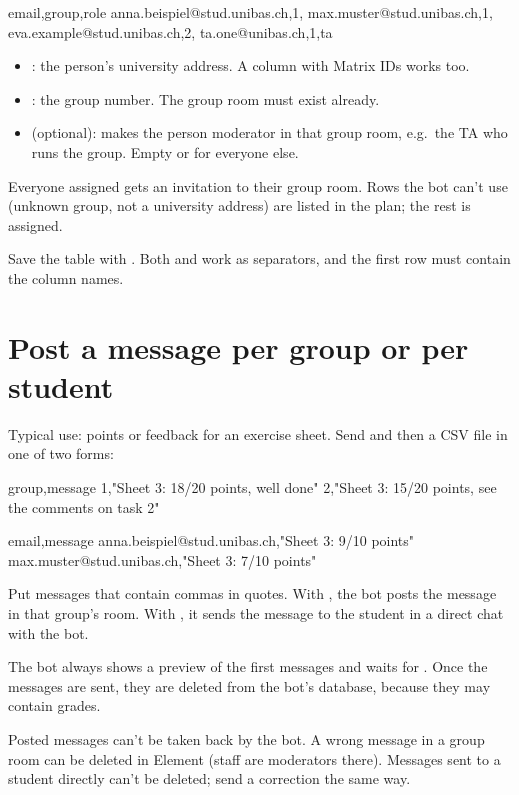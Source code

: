 \begin{codefile}
email,group,role
anna.beispiel@stud.unibas.ch,1,
max.muster@stud.unibas.ch,1,
eva.example@stud.unibas.ch,2,
ta.one@unibas.ch,1,ta
\end{codefile}

\begin{itemize}
  \item {}: the person's university address. A column  with Matrix IDs
        works too.
  \item {}: the group number. The group room must exist already.
  \item {} (optional):  makes the person moderator in that group room, e.g.\
        the TA who runs the group. Empty or  for everyone else.
\end{itemize}

Everyone assigned gets an invitation to their group room. Rows the bot can't use (unknown
group, not a university address) are listed in the plan; the rest is assigned.

\begin{tip}[Excel]
Save the table with  \then {} \then {}.
Both \cmd{,} and \cmd{;} work as separators, and the first row must contain the column names.
\end{tip}

\section{Post a message per group or per student}

Typical use: points or feedback for an exercise sheet. Send  and then
a CSV file in one of two forms:

\begin{codefile}
group,message
1,"Sheet 3: 18/20 points, well done"
2,"Sheet 3: 15/20 points, see the comments on task 2"
\end{codefile}

\begin{codefile}
email,message
anna.beispiel@stud.unibas.ch,"Sheet 3: 9/10 points"
max.muster@stud.unibas.ch,"Sheet 3: 7/10 points"
\end{codefile}

Put messages that contain commas in quotes. With , the bot posts the message in
that group's room. With \cmd{email}, it sends the message to the student in a direct chat with
the bot.

The bot always shows a preview of the first messages and waits for . Once the
messages are sent, they are deleted from the bot's database, because they may contain grades.

\begin{warning}
Posted messages can't be taken back by the bot. A wrong message in a group room can be
deleted in Element (staff are moderators there). Messages sent to a student directly can't
be deleted; send a correction the same way.
\end{warning}
